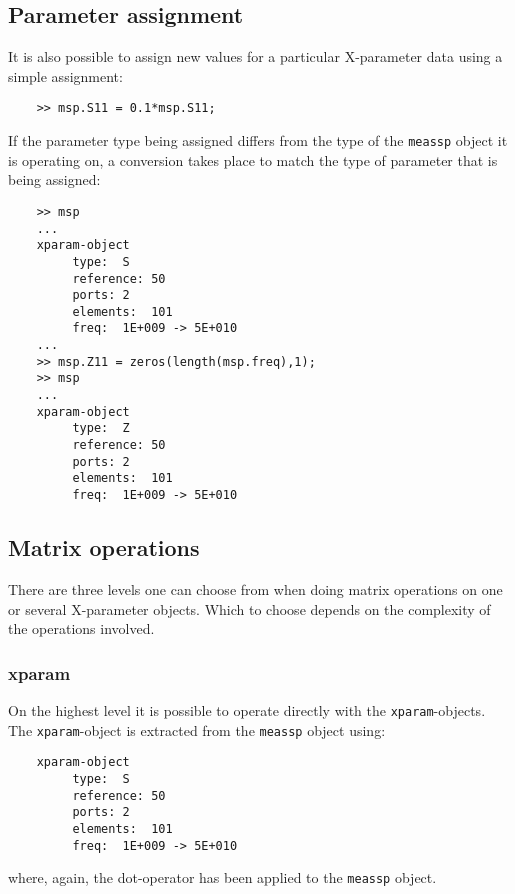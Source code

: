 \subsection{Parameter assignment}
It is also possible to assign new values for a particular
X-parameter data using a simple assignment:
\begin{small}
\begin{verbatim}
    >> msp.S11 = 0.1*msp.S11;
\end{verbatim}
\end{small}
If the parameter type being assigned differs from the type of the
\verb"meassp" object it is operating on, a conversion takes place
to match the type of parameter that is being assigned:
\begin{small}
\begin{verbatim}
    >> msp
    ...
    xparam-object
    	 type:	S
    	 reference:	50
    	 ports:	2
    	 elements:	101
    	 freq:	1E+009 -> 5E+010
    ...
    >> msp.Z11 = zeros(length(msp.freq),1);
    >> msp
    ...
    xparam-object
    	 type:	Z
    	 reference:	50
    	 ports:	2
    	 elements:	101
    	 freq:	1E+009 -> 5E+010
\end{verbatim}
\end{small}

\subsection{Matrix operations}
There are three levels one can choose from when doing matrix
operations on one or several X-parameter objects. Which to choose
depends on the complexity of the operations involved.

\subsubsection{xparam}
On the highest level it is possible to operate directly with the
\verb"xparam"-objects. The \verb"xparam"-object is extracted from
the \verb"meassp" object using:
\begin{small}
\begin{verbatim}
    xparam-object
    	 type:	S
    	 reference:	50
    	 ports:	2
    	 elements:	101
    	 freq:	1E+009 -> 5E+010
\end{verbatim}
\end{small}
where, again, the dot-operator has been applied to the
\verb"meassp" object.

